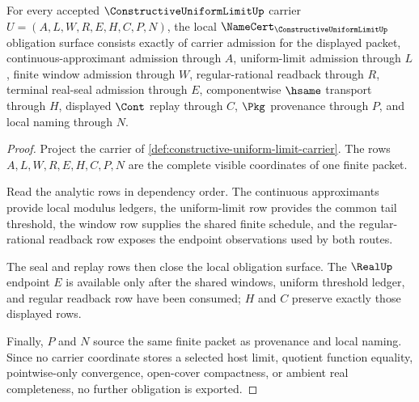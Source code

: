 \begin{theorem}
\label{thm:constructive-uniform-limit-namecert-obligations}
For every accepted $\ConstructiveUniformLimitUp$ carrier $U=(A,L,W,R,E,H,C,P,N)$, the local $\NameCert_{\ConstructiveUniformLimitUp}$ obligation surface consists exactly of carrier admission for the displayed packet, continuous-approximant admission through $A$, uniform-limit admission through $L$, finite window admission through $W$, regular-rational readback through $R$, terminal real-seal admission through $E$, componentwise $\hsame$ transport through $H$, displayed $\Cont$ replay through $C$, $\Pkg$ provenance through $P$, and local naming through $N$.
\end{theorem}
\begin{proof}
Project the carrier of \autoref{def:constructive-uniform-limit-carrier}. The rows $A,L,W,R,E,H,C,P,N$ are the complete visible coordinates of one finite packet.

Read the analytic rows in dependency order. The continuous approximants provide local modulus ledgers, the uniform-limit row provides the common tail threshold, the window row supplies the shared finite schedule, and the regular-rational readback row exposes the endpoint observations used by both routes.

The seal and replay rows then close the local obligation surface. The $\RealUp$ endpoint $E$ is available only after the shared windows, uniform threshold ledger, and regular readback row have been consumed; $H$ and $C$ preserve exactly those displayed rows.

Finally, $P$ and $N$ source the same finite packet as provenance and local naming. Since no carrier coordinate stores a selected host limit, quotient function equality, pointwise-only convergence, open-cover compactness, or ambient real completeness, no further obligation is exported.
\end{proof}

